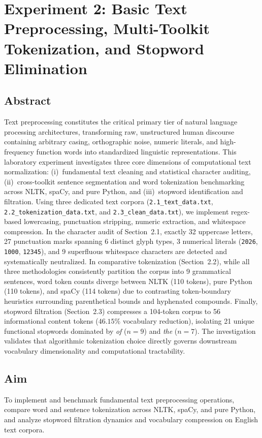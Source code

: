 \chapter{Experiment 2: Basic Text Preprocessing, Multi-Toolkit Tokenization, and Stopword Elimination}
\label{chap:exp2}

\section{Abstract}
Text preprocessing constitutes the critical primary tier of natural language processing architectures, transforming raw, unstructured human discourse containing arbitrary casing, orthographic noise, numeric literals, and high-frequency function words into standardized linguistic representations. This laboratory experiment investigates three core dimensions of computational text normalization: (i)~fundamental text cleaning and statistical character auditing, (ii)~cross-toolkit sentence segmentation and word tokenization benchmarking across NLTK, spaCy, and pure Python, and (iii)~stopword identification and filtration. Using three dedicated text corpora (\texttt{2.1\_text\_data.txt}, \texttt{2.2\_tokenization\_data.txt}, and \texttt{2.3\_clean\_data.txt}), we implement regex-based lowercasing, punctuation stripping, numeric extraction, and whitespace compression. In the character audit of Section~2.1, exactly 32 uppercase letters, 27 punctuation marks spanning 6 distinct glyph types, 3 numerical literals (\texttt{2026}, \texttt{1000}, \texttt{12345}), and 9 superfluous whitespace characters are detected and systematically neutralized. In comparative tokenization (Section~2.2), while all three methodologies consistently partition the corpus into 9 grammatical sentences, word token counts diverge between NLTK (110 tokens), pure Python (110 tokens), and spaCy (114 tokens) due to contrasting token-boundary heuristics surrounding parenthetical bounds and hyphenated compounds. Finally, stopword filtration (Section~2.3) compresses a 104-token corpus to 56 informational content tokens ($46.15\%$ vocabulary reduction), isolating 21 unique functional stopwords dominated by \textit{of} ($n=9$) and \textit{the} ($n=7$). The investigation validates that algorithmic tokenization choice directly governs downstream vocabulary dimensionality and computational tractability.

\section{Aim}
To implement and benchmark fundamental text preprocessing operations, compare word and sentence tokenization across NLTK, spaCy, and pure Python, and analyze stopword filtration dynamics and vocabulary compression on English text corpora.

